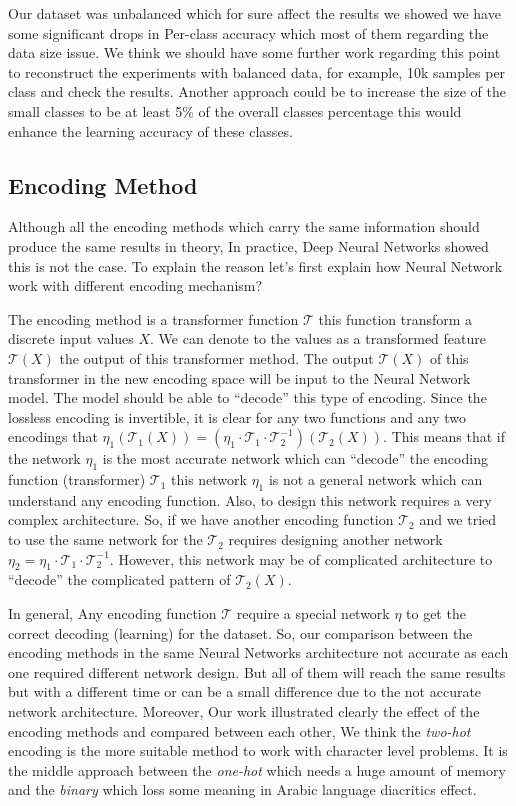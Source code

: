 Our dataset was unbalanced which for sure affect the results we showed we have some significant drops in Per-class accuracy which most of them regarding the data size issue. We think we should have some further work regarding this point to reconstruct the experiments with balanced data, for example, 10k samples per class and check the results. Another approach could be to increase the size of the small classes to be at least 5\% of the overall classes percentage this would enhance the learning accuracy of these classes.  
\subsection{Encoding Method}

Although all the encoding methods which carry the same information should produce the same results in theory, In practice, Deep Neural Networks showed this is not the case. To explain the reason let’s first explain how Neural Network work with different encoding mechanism?

The encoding method is a transformer function $\mathcal{T}$ this function transform a discrete input values $X$. We can denote to the values as a transformed feature $\mathcal{T}(X)$ the output of this transformer method. The output $\mathcal{T}(X)$ of this transformer in the new encoding space will be input to the Neural Network model. The model should be able to ``decode''  this type of encoding. Since the lossless encoding is invertible, it is clear for any two functions and any two encodings that $\eta_1\left(\mathcal{T}_1(X)\right) = \left(\eta_1\cdot\mathcal{T}_1\cdot \mathcal{T}_2^{-1} \right)\left(\mathcal{T}_2(X)\right)$. This means that if the network $\eta_1$ is the most accurate network which can ``decode'' the encoding function (transformer) $\mathcal{T}_1$ this network $\eta_1$ is not a general network which can understand any encoding function. Also, to design this network requires a very complex architecture. So, if we have another encoding function $\mathcal{T}_2$ and we tried to use the same network for the $\mathcal{T}_2$ requires designing another network $\eta_2 = \eta_1\cdot\mathcal{T}_1\cdot \mathcal{T}_2^{-1}$. However, this network may be of complicated architecture to ``decode'' the complicated pattern of $\mathcal{T}_2(X)$.

In general, Any encoding function $\mathcal{T}$ require a special network $\eta$ to get the correct decoding (learning) for the dataset. So, our comparison between the encoding methods in the same Neural Networks architecture not accurate as each one required different network design. But all of them will reach the same results but with a different time or can be a small difference due to the not accurate network architecture. Moreover, Our work illustrated clearly the effect of the encoding methods and compared between each other, We think the \textit{\textit{two-hot}} encoding is the more suitable method to work with character level problems. It is the middle approach between the \textit{\textit{one-hot}} which needs a huge amount of memory and the \textit{\textit{binary}} which loss some meaning in Arabic language diacritics effect.


